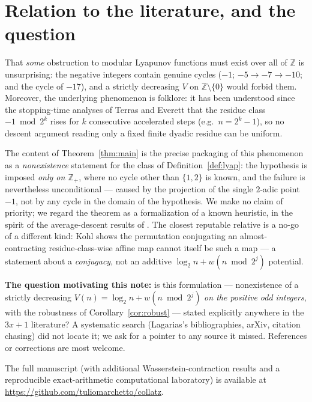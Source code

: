 \documentclass[10pt]{amsart}
\theoremstyle{definition}
\theoremstyle{remark}
\newcommand{\Z}{\mathbb{Z}}
\begin{document}
\section{Relation to the literature, and the question}

That \emph{some} obstruction to modular Lyapunov functions must exist over all of $\Z$ is unsurprising: the negative integers contain genuine cycles ($-1$; $-5 \to -7 \to -10$; and the cycle of $-17$), and a strictly decreasing $V$ on $\Z\setminus\{0\}$ would forbid them. Moreover, the underlying phenomenon is folklore: it has been understood since the stopping-time analyses of Terras \cite{terras1976} and Everett \cite{everett1977} that the residue class $-1 \bmod 2^k$ rises for $k$ consecutive accelerated steps (e.g.\ $n = 2^k-1$), so no descent argument reading only a fixed finite dyadic residue can be uniform.

The content of Theorem~\ref{thm:main} is the precise packaging of this phenomenon as a \emph{nonexistence} statement for the class of Definition~\ref{def:lyap}: the hypothesis is imposed \emph{only on $\Z_+$}, where no cycle other than $\{1,2\}$ is known, and the failure is nevertheless unconditional --- caused by the projection of the single $2$-adic point $-1$, not by any cycle in the domain of the hypothesis. We make no claim of priority; we regard the theorem as a formalization of a known heuristic, in the spirit of the average-descent results of \cite{terras1976,tao2022}. The closest reputable relative is a no-go of a different kind: Kohl \cite{kohl2008} shows the permutation conjugating an almost-contracting residue-class-wise affine map cannot itself be such a map --- a statement about a \emph{conjugacy}, not an additive $\log_2 n + w(n\bmod 2^j)$ potential.

\textbf{The question motivating this note:} is this formulation --- nonexistence of a strictly decreasing $V(n)=\log_2 n + w(n \bmod 2^j)$ \emph{on the positive odd integers}, with the robustness of Corollary~\ref{cor:robust} --- stated explicitly anywhere in the $3x+1$ literature? A systematic search (Lagarias's bibliographies, arXiv, citation chasing) did not locate it; we ask for a pointer to any source it missed. References or corrections are most welcome.

The full manuscript (with additional Wasserstein-contraction results and a reproducible exact-arithmetic computational laboratory) is available at \url{https://github.com/tuliomarchetto/collatz}.
\end{document}
